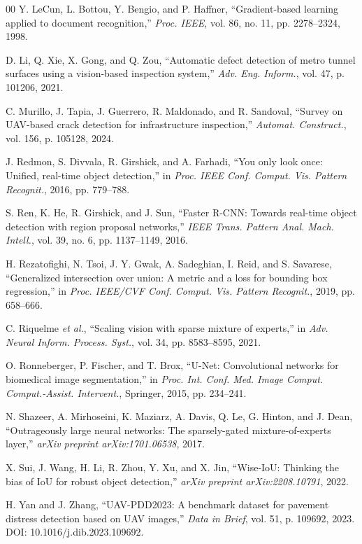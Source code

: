 \documentclass{ieeeaccess}
\begin{document}
{\begin{thebibliography}{00}
 Y. LeCun, L. Bottou, Y. Bengio, and P. Haffner, ``Gradient-based learning applied to document recognition,'' \emph{Proc. IEEE}, vol. 86, no. 11, pp. 2278--2324, 1998.

 D. Li, Q. Xie, X. Gong, and Q. Zou, ``Automatic defect detection of metro tunnel surfaces using a vision-based inspection system,'' \emph{Adv. Eng. Inform.}, vol. 47, p. 101206, 2021.

 C. Murillo, J. Tapia, J. Guerrero, R. Maldonado, and R. Sandoval, ``Survey on UAV-based crack detection for infrastructure inspection,'' \emph{Automat. Construct.}, vol. 156, p. 105128, 2024.

 J. Redmon, S. Divvala, R. Girshick, and A. Farhadi, ``You only look once: Unified, real-time object detection,'' in \emph{Proc. IEEE Conf. Comput. Vis. Pattern Recognit.}, 2016, pp. 779--788.

 S. Ren, K. He, R. Girshick, and J. Sun, ``Faster R-CNN: Towards real-time object detection with region proposal networks,'' \emph{IEEE Trans. Pattern Anal. Mach. Intell.}, vol. 39, no. 6, pp. 1137--1149, 2016.

 H. Rezatofighi, N. Tsoi, J. Y. Gwak, A. Sadeghian, I. Reid, and S. Savarese, ``Generalized intersection over union: A metric and a loss for bounding box regression,'' in \emph{Proc. IEEE/CVF Conf. Comput. Vis. Pattern Recognit.}, 2019, pp. 658--666.

 C. Riquelme \emph{et al.}, ``Scaling vision with sparse mixture of experts,'' in \emph{Adv. Neural Inform. Process. Syst.}, vol. 34, pp. 8583--8595, 2021.

 O. Ronneberger, P. Fischer, and T. Brox, ``U-Net: Convolutional networks for biomedical image segmentation,'' in \emph{Proc. Int. Conf. Med. Image Comput. Comput.-Assist. Intervent.}, Springer, 2015, pp. 234--241.

 N. Shazeer, A. Mirhoseini, K. Maziarz, A. Davis, Q. Le, G. Hinton, and J. Dean, ``Outrageously large neural networks: The sparsely-gated mixture-of-experts layer,'' \emph{arXiv preprint arXiv:1701.06538}, 2017.

 X. Sui, J. Wang, H. Li, R. Zhou, Y. Xu, and X. Jin, ``Wise-IoU: Thinking the bias of IoU for robust object detection,'' \emph{arXiv preprint arXiv:2208.10791}, 2022.

 H. Yan and J. Zhang, ``UAV-PDD2023: A benchmark dataset for pavement distress detection based on UAV images,'' \emph{Data in Brief}, vol. 51, p. 109692, 2023. DOI: 10.1016/j.dib.2023.109692.


\end{thebibliography}}
\end{document}
